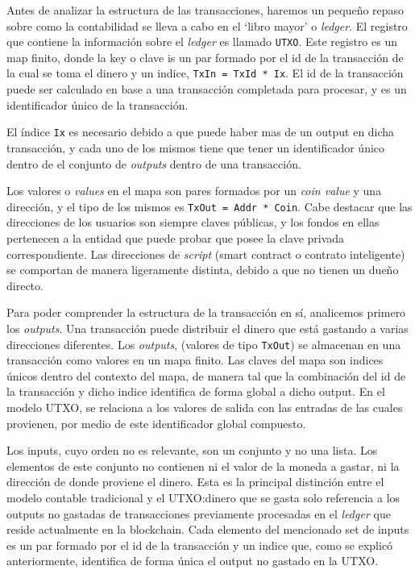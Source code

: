 \documentclass[12pt]{book}
\begin{document}

Antes de analizar la estructura de las transacciones, haremos un pequeño repaso sobre como la contabilidad se lleva a cabo en el `libro mayor' o \textit{ledger}. El registro que contiene la información sobre el \textit{ledger} es llamado \texttt{UTXO}. Este registro es un map finito, donde la key o clave is un par formado por el id de la transacción de la cual se toma el dinero y un indice, \texttt{TxIn = TxId * Ix}. El id de la transacción puede ser calculado en base a una transacción completada para procesar, y es un identificador único de la transacción.

El índice \texttt{Ix} es necesario debido a que puede haber mas de un output en dicha transacción, y cada uno de los mismos tiene que tener un identificador único dentro de el conjunto de \textit{outputs} dentro de una transacción.

Los valores o \textit{values} en el mapa son pares formados por un \textit{coin value} y una dirección, y el tipo de los mismos es \texttt{TxOut = Addr * Coin}. Cabe destacar que las direcciones de los usuarios son siempre claves públicas, y los fondos en ellas pertenecen a la entidad que puede probar que posee la clave privada correspondiente. Las direcciones de \textit{script} (smart contract o contrato inteligente) se comportan de manera ligeramente distinta, debido a que no tienen un dueño directo.

Para poder comprender la estructura de la transacción en sí, analicemos primero los \textit{outputs}. Una transacción puede distribuir el dinero que está gastando a varias direcciones diferentes. Los \textit{outputs}, (valores de tipo \texttt{TxOut}) se almacenan en una transacción como valores en un mapa finito.
Las claves del mapa son indices únicos dentro del contexto del mapa, de manera tal que la combinación del id de la transacción y dicho indice identifica de forma global a dicho output.
En el modelo UTXO, se relaciona a los valores de salida con las entradas de las cuales provienen, por medio de este identificador global compuesto.


Los inputs, cuyo orden no es relevante, son un conjunto y no una lista. Los elementos de este conjunto no contienen ni el valor de la moneda a gastar, ni la dirección de donde proviene el dinero. Esta es la principal distinción entre el modelo contable tradicional y el UTXO:\@el dinero que se gasta solo referencia a los outputs no gastadas de transacciones previamente procesadas en el \textit{ledger} que reside actualmente en la blockchain. Cada elemento del mencionado set de inputs es un par formado por el id de la transacción y un indice que, como se explicó anteriormente, identifica de forma única el output no gastado en la UTXO.\@
\end{document}
